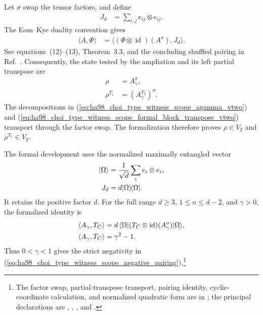 \documentclass{article}
\begin{document}
Let $\sigma$ swap the tensor factors, and define
\begin{align}
    J_d
        &=\sum_{i,j}e_{ij}\otimes e_{ij}.
    \label{eq:ha98_choi_type_witness_scope_jd}
\end{align}
The Eom--Kye duality convention gives
\begin{align}
    \langle A,\Phi\rangle
        &=\bigl\langle
            (\Phi\otimes\operatorname{id})(A^\sigma),J_d
          \bigr\rangle.
    \label{eq:ha98_choi_type_witness_scope_eom_kye_orientation}
\end{align}
See equations~(12)--(13), Theorem~3.3, and the concluding shuffled pairing in
Ref.~\cite[pp.~137--139]{EomKye2000Duality}. Consequently, the state tested by
the ampliation and its left partial transpose are
\begin{align}
    \rho
        &=A_\gamma^\sigma,
    \label{eq:ha98_choi_type_witness_scope_witness_state}\\
    \rho^{T_1}
        &=(A_\gamma^{T_2})^\sigma.
    \label{eq:ha98_choi_type_witness_scope_partial_transpose_transport}
\end{align}
The decompositions in
(\ref{eq:ha98_choi_type_witness_scope_agamma_vtwo}) and
(\ref{eq:ha98_choi_type_witness_scope_formal_block_transpose_vtwo}) transport
through the factor swap. The formalization therefore proves
$\rho\in V_2$ and $\rho^{T_1}\in V_2$.

The formal development uses the normalized maximally entangled vector
\begin{align}
    |\Omega\rangle
        &=\frac{1}{\sqrt d}\sum_i e_i\otimes e_i,
    \label{eq:ha98_choi_type_witness_scope_normalized_omega}\\
    J_d
        &=d|\Omega\rangle\!\langle \Omega|.
    \label{eq:ha98_choi_type_witness_scope_omega_normalization}
\end{align}
It retains the positive factor $d$. For the full range $d\geq3$,
$1\leq n\leq d-2$, and $\gamma>0$, the formalized identity is
\begin{align}
    \langle A_\gamma,T_C\rangle
        &=d\,\langle \Omega|
          (T_C\otimes\operatorname{id})(A_\gamma^\sigma)
          |\Omega\rangle,
    \label{eq:ha98_choi_type_witness_scope_pairing_quadratic_form}\\
    \langle A_\gamma,T_C\rangle
        &=\gamma^2-1.
    \label{eq:ha98_choi_type_witness_scope_formal_negative_pairing}
\end{align}
Thus $0<\gamma<1$ gives the strict negativity in
(\ref{eq:ha98_choi_type_witness_scope_negative_pairing}).\footnote{The factor
swap, partial-transpose transport, pairing identity, cyclic-coordinate
calculation, and normalized quadratic form are in
; the principal
declarations are
,
,
, and
.}
\end{document}
